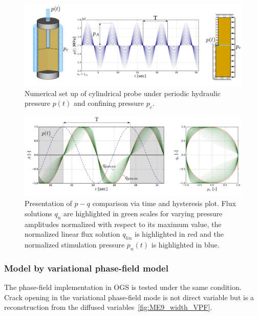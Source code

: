 \begin{figure}
\centering
\includegraphics[width=1\linewidth]{figures/ME9_experimental_set_up_nl_pq.pdf}
\caption{Numerical set up of cylindrical probe under periodic hydraulic pressure $p(t)$ and
confining pressure $p_c$.}
\label{fig:ME9_validation_set_up1}
\end{figure}
\begin{figure}
\centering
\includegraphics[width=1\linewidth]{figures/ME9_non_linear_p_q.pdf}
\caption{Presentation of $p-q$ comparison via time and hysteresis plot. Flux solutions $q_n$ are
highlighted in green scales for varying pressure amplitudes normalized with respect to its maximum value, the normalized linear flux solution $q_{lin}$ is highlighted in red and the normalized stimulation pressure $p_n(t)$ is highlighted in blue.}
\label{fig:ME9_validation_compressibility1}
\end{figure}

\subsubsection*{Model by variational phase-field model}
The phase-field implementation in OGS is tested under the same condition.
Crack opening in the variational phase-field mode is not direct variable but is a reconstruction from the diffused variables~\ref{fig:ME9_width_VPF}.


